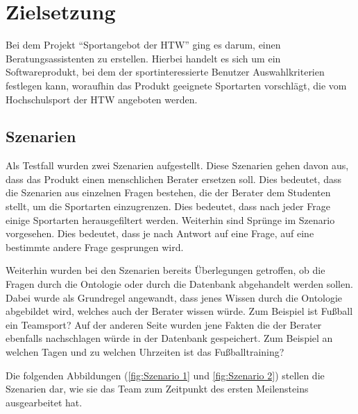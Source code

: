 \chapter{Zielsetzung}
Bei dem Projekt "`Sportangebot der HTW"' ging es darum, einen Beratungsassistenten zu erstellen. Hierbei handelt es sich um ein Softwareprodukt, bei dem der sportinteressierte Benutzer Auswahlkriterien festlegen kann, woraufhin das Produkt geeignete Sportarten vorschlägt, die vom Hochschulsport der HTW angeboten werden.

\section{Szenarien}
Als Testfall wurden zwei Szenarien aufgestellt. Diese Szenarien gehen davon aus, dass das Produkt einen menschlichen Berater ersetzen soll. Dies bedeutet, dass die Szenarien aus einzelnen Fragen bestehen, die der Berater dem Studenten stellt, um die Sportarten einzugrenzen. Dies bedeutet, dass nach jeder Frage einige Sportarten herausgefiltert werden. Weiterhin sind Sprünge im Szenario vorgesehen. Dies bedeutet, dass je nach Antwort auf eine Frage, auf eine bestimmte andere Frage gesprungen wird.

Weiterhin wurden bei den Szenarien bereits Überlegungen getroffen, ob die Fragen durch die Ontologie oder durch die Datenbank abgehandelt werden sollen. Dabei wurde als Grundregel angewandt, dass jenes Wissen durch die Ontologie abgebildet wird, welches auch der Berater wissen würde. Zum Beispiel ist Fußball ein Teamsport? Auf der anderen Seite wurden jene Fakten die der Berater ebenfalls nachschlagen würde in der Datenbank gespeichert. Zum Beispiel an welchen Tagen und zu welchen Uhrzeiten ist das Fußballtraining?

Die folgenden Abbildungen (\ref{fig:Szenario 1} und \ref{fig:Szenario 2}) stellen die Szenarien dar, wie sie das Team zum Zeitpunkt des ersten Meilensteins ausgearbeitet hat.

